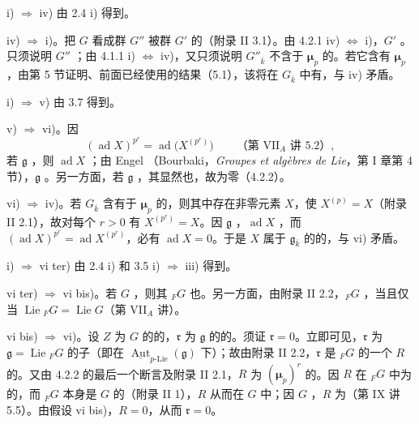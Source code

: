 i) $\Rightarrow$ iv) 由 2.4 i) 得到。

iv) $\Rightarrow$ i)。把 $G$ 看成群 $G''$ 被群 $G'$ 的（附录 II 3.1）。由 4.2.1 iv) $\Leftrightarrow$ i)，$G'$ 。只须说明 $G''$ ；由 4.1.1 i) $\Leftrightarrow$ iv)，又只须说明 $G''_{\overline k}$ 不含于 $\boldsymbol\mu_p$ 的。若它含有 $\boldsymbol\mu_p$，由第 5 节证明、前面已经使用的结果（5.1），该将在 $G_{\overline k}$ 中有，与 iv) 矛盾。

i) $\Rightarrow$ v) 由 3.7 得到。

v) $\Rightarrow$ vi)。因
\[(\operatorname{ad}X)^{p^r}=\operatorname{ad}\bigl(X^{(p^r)}\bigr)\qquad\text{（第 VII$_A$ 讲 5.2）},\]
若 $\mathfrak g$ ，则 $\operatorname{ad}X$ ；由 Engel （Bourbaki，\textit{Groupes et algèbres de Lie}，第 I 章第 4 节），$\mathfrak g$ 。另一方面，若 $\mathfrak g$ ，其显然也，故为零（4.2.2）。

vi) $\Rightarrow$ iv)。若 $G_{\overline k}$ 含有于 $\boldsymbol\mu_p$ 的，则其中存在非零元素 $X$，使 $X^{(p)}=X$（附录 II 2.1），故对每个 $r>0$ 有 $X^{(p^r)}=X$。因 $\mathfrak g$ ，$\operatorname{ad}X$ ，而 $(\operatorname{ad}X)^{p^r}=\operatorname{ad}X^{(p^r)}$，必有 $\operatorname{ad}X=0$。于是 $X$ 属于 $\mathfrak g_{\overline k}$ 的的，与 vi) 矛盾。

i) $\Rightarrow$ vi ter) 由 2.4 i) 和 3.5 i) $\Rightarrow$ iii) 得到。

vi ter) $\Rightarrow$ vi bis)。若 $G$ ，则其 ${}_FG$ 也。另一方面，由附录 II 2.2，${}_FG$ ，当且仅当 $\operatorname{Lie}{}_FG=\operatorname{Lie}G$（第 VII$_A$ 讲）。

vi bis) $\Rightarrow$ vi)。设 $Z$ 为 $G$ 的的，$\mathfrak r$ 为 $\mathfrak g$ 的的。须证 $\mathfrak r=0$。立即可见，$\mathfrak r$ 为 $\mathfrak g=\operatorname{Lie}{}_FG$ 的子（即在 $\underline{\operatorname{Aut}}_{p\text{-Lie}}(\mathfrak g)$ 下）；故由附录 II 2.2，$\mathfrak r$ 是 ${}_FG$ 的一个 $R$ 的。又由 4.2.2 的最后一个断言及附录 II 2.1，$R$ 为 $(\boldsymbol\mu_p)^r$ 的。因 $R$ 在 ${}_FG$ 中为的，而 ${}_FG$ 本身是 $G$ 的（附录 II 1），$R$ 从而在 $G$ 中；因 $G$ ，$R$ 为（第 IX 讲 5.5）。由假设 vi bis)，$R=0$，从而 $\mathfrak r=0$。


